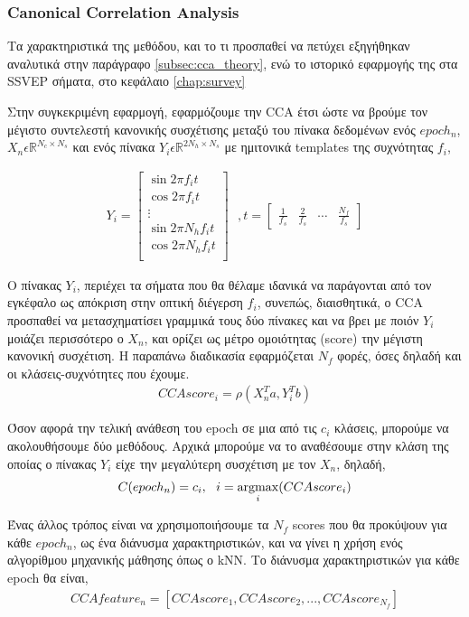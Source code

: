 \documentclass[11pt,a4paper,english,greek,twoside]{../Thesis}
\begin{document}
\subsubsection{Canonical Correlation Analysis}
\par Τα χαρακτηριστικά της μεθόδου, και το τι προσπαθεί να πετύχει εξηγήθηκαν αναλυτικά στην παράγραφο \ref{subsec:cca_theory}, ενώ το ιστορικό εφαρμογής της στα SSVEP σήματα, στο κεφάλαιο \ref{chap:survey} 

\par Στην συγκεκριμένη εφαρμογή, εφαρμόζουμε την CCA έτσι ώστε να βρούμε τον μέγιστο συντελεστή κανονικής συσχέτισης μεταξύ του πίνακα δεδομένων ενός $epoch_n$, $X_n \epsilon \mathbb{R}^{N_c\times N_s}$ και ενός πίνακα $Y_i \epsilon \mathbb{R}^{2N_h\times N_s}$ με ημιτονικά templates της συχνότητας $f_i$,

\begin{align}
\label{eq:cca_templates_Y}
    Y_i = \begin{bmatrix}
            \sin{2\pi f_i t} \\
            \cos{2\pi f_i t} \\
            \vdots \\
            \sin{2\pi N_hf_i t} \\
            \cos{2\pi N_hf_i t} \\
          \end{bmatrix}
          \ \ \ ,
    t = \begin{bmatrix}
            \frac{1}{f_s} & \frac{2}{f_s} & \cdots & \frac{N_f}{f_s}
        \end{bmatrix}
\end{align}

\par Ο πίνακας $Y_i$, περιέχει τα σήματα που θα θέλαμε ιδανικά να παράγονται από τον εγκέφαλο ως απόκριση στην οπτική διέγερση $f_i$, συνεπώς, διαισθητικά, ο CCA προσπαθεί να μετασχηματίσει γραμμικά τους δύο πίνακες και να βρει με ποιόν $Y_i$ μοιάζει περισσότερο ο $X_n$, και ορίζει ως μέτρο ομοιότητας (score) την μέγιστη κανονική συσχέτιση. Η παραπάνω διαδικασία εφαρμόζεται $N_f$ φορές, όσες δηλαδή και οι κλάσεις-συχνότητες που έχουμε.
\begin{align}
    CCAscore_i = \rho(X_n^Ta,Y_i^Tb)
\end{align}
\par Όσον αφορά την τελική ανάθεση του epoch σε μια από τις $c_i$ κλάσεις, μπορούμε να ακολουθήσουμε δύο μεθόδους. Αρχικά μπορούμε να το αναθέσουμε στην κλάση της οποίας ο πίνακας $Y_i$ είχε την μεγαλύτερη συσχέτιση με τον $X_n$, δηλαδή,
\begin{align}
    C(epoch_n) = c_i, \ \  i=\operatorname*{argmax}_i(CCAscore_i)
    \label{eqCCAmax}
\end{align}
\par Ένας άλλος τρόπος είναι να χρησιμοποιήσουμε τα $N_f$ scores που θα προκύψουν για κάθε $epoch_n$, ως ένα διάνυσμα χαρακτηριστικών, και να γίνει η χρήση ενός αλγορίθμου μηχανικής μάθησης όπως ο kNN. Το διάνυσμα χαρακτηριστικών για κάθε epoch θα είναι, 
\begin{align}
    CCAfeature_n = [CCAscore_1,CCAscore_2,...,CCAscore_{N_f}]
    \label{eqCCAkNN}
\end{align}
\end{document}
